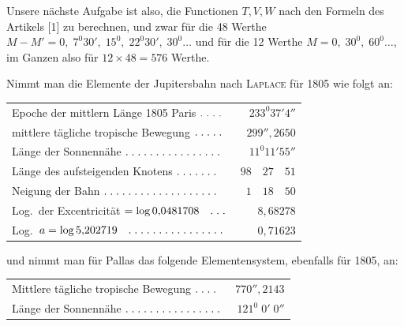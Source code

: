 \begin{landscape}
\par\noindent\hspace*{\parindent}Unsere nächste Aufgabe ist also, die Functionen \(T,V,W\) nach den Formeln des Artikels [1] zu berechnen, und zwar für die 48 Werthe \(M-M'=0,\;7^0 30',\;15^0,\;22^0 30',\;30^0\ldots\) und für die 12 Werthe \(M=0,\;30^0,\;60^0\ldots\), im Ganzen also für \(12\times48=576\) Werthe.
\par\noindent\edef\VSixSavedIndent{\the\parindent}\begin{minipage}{\linewidth}\setlength{\parindent}{\VSixSavedIndent}
\par\noindent\hspace*{\parindent}Nimmt man die Elemente der Jupitersbahn nach \textsc{Laplace} für 1805 wie folgt an:
\begin{center}
\begin{tabular}{@{}l@{\quad}r@{}}
Epoche der mittlern Länge 1805 Paris \(\VSixPoint\VSixPoint\VSixPoint\VSixPoint\)&\(233^0 37'4''\)\\
mittlere tägliche tropische Bewegung \(\VSixPoint\VSixPoint\VSixPoint\VSixPoint\VSixPoint\)&\(299''{,}2650\)\\
Länge der Sonnennähe \(\VSixTenPoints\VSixPoint\VSixPoint\VSixPoint\VSixPoint\VSixPoint\VSixPoint\)&\(11^0 11'55''\)\\
Länge des aufsteigenden Knotens \(\VSixPoint\VSixPoint\VSixPoint\VSixPoint\VSixPoint\VSixPoint\VSixPoint\)&\(98\quad27\quad51\)\\
Neigung der Bahn \(\VSixTenPoints\VSixPoint\VSixPoint\VSixPoint\VSixPoint\VSixPoint\VSixPoint\VSixPoint\VSixPoint\VSixPoint\)&\(1\quad18\quad50\)\\
Log.\ der Excentricität \(=\log0{,}0481708\quad\VSixPoint\VSixPoint\VSixPoint\)&\(8{,}68278\)\\
Log.\ \(a=\log5{,}202719\quad\VSixTenPoints\VSixPoint\VSixPoint\VSixPoint\VSixPoint\VSixPoint\VSixPoint\)&\(0{,}71623\)
\end{tabular}
\end{center}
\end{minipage}\par
\noindent und nimmt man für Pallas das folgende Elementensystem, ebenfalls für 1805, an:
\begin{center}
\begin{tabular}{@{}l@{\quad}r@{}}
Mittlere tägliche tropische Bewegung \(\VSixPoint\VSixPoint\VSixPoint\VSixPoint\)&\(770''{,}2143\)\\
Länge der Sonnennähe \(\VSixTenPoints\VSixPoint\VSixPoint\VSixPoint\VSixPoint\VSixPoint\VSixPoint\)&\(121^0\;0'\;0''\)\\

\end{tabular}
\end{center}
\end{landscape}
